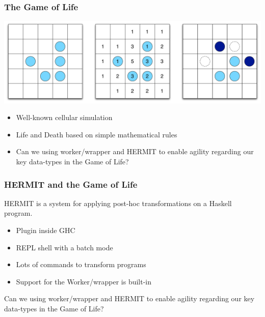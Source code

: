 \documentclass[smaller]{beamer}
\begin{document}
\begin{frame}[fragile]
\frametitle{The Game of Life}

\includegraphics[width=\textwidth]{images/LifeGrid.pdf}

\begin{itemize}
\item Well-known cellular simulation
\item Life and Death based on simple mathematical rules
\item Can we using worker/wrapper and HERMIT to enable agility regarding
our key data-types in the Game of Life?
\end{itemize}
\end{frame}


\begin{frame}[fragile]
\frametitle{HERMIT and the Game of Life}
\Large

HERMIT is a system for applying post-hoc transformations on a Haskell program.
\begin{itemize}
\item Plugin inside GHC
\item REPL shell with a batch mode
\item Lots of commands to transform programs
\item Support for the Worker/wrapper is built-in
\end{itemize}

\frameskip

Can we using worker/wrapper and HERMIT to enable agility regarding
our key data-types in the Game of Life?

\end{frame}
\end{document}

